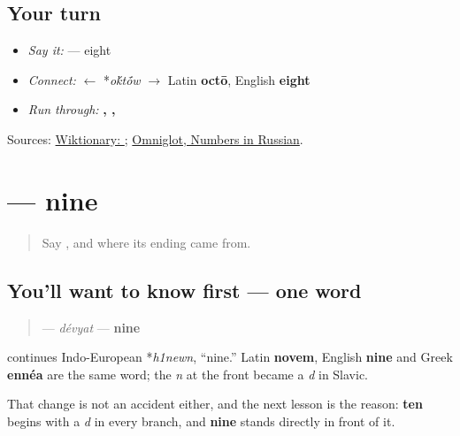 \subsection*{Your turn}
\begin{itemize}
\raggedright
  \item \emph{Say it:} \textbf{} — eight
  \item \emph{Connect:} \textbf{} $\leftarrow$ *\emph{o\'{k}t\'{\={o}}w} $\to$ Latin \textbf{octō}, English \textbf{eight}
  \item \emph{Run through:} \textbf{, , }
\end{itemize}

\begin{tcolorbox}[breakable,colback=teal!4,colframe=teal!35!black,title={Before you move on}]
Sources: \href{https://en.wiktionary.org/wiki/\%D0\%B2\%D0\%BE\%D1\%81\%D0\%B5\%D0\%BC\%D1\%8C}{Wiktionary: }; \href{https://www.omniglot.com/language/numbers/russian.htm}{Omniglot, Numbers in Russian}.
\end{tcolorbox}
\section[\texorpdfstring{\ru{девять} (dévyat)}{девять (dévyat)}]{ — nine}

\label{lesson:RU-C24-devyat}



\begin{quote}
Say \textbf{}, and where its ending came from.
\end{quote}

\subsection*{You'll want to know first — one word}
\begin{quote}
\textbf{} — \emph{dévyat} — \textbf{nine}
\end{quote}

\begin{cousinweb}
\textbf{} continues Indo-European *\emph{h1newn}, \textquotedblleft{}nine.\textquotedblright{} Latin \textbf{novem}, English \textbf{nine} and Greek \textbf{ennéa} are the same word; the \emph{n} at the front became a \emph{d} in Slavic.

That change is not an accident either, and the next lesson is the reason: \textbf{ten} begins with a \emph{d} in every branch, and \textbf{nine} stands directly in front of it.
\end{cousinweb}

